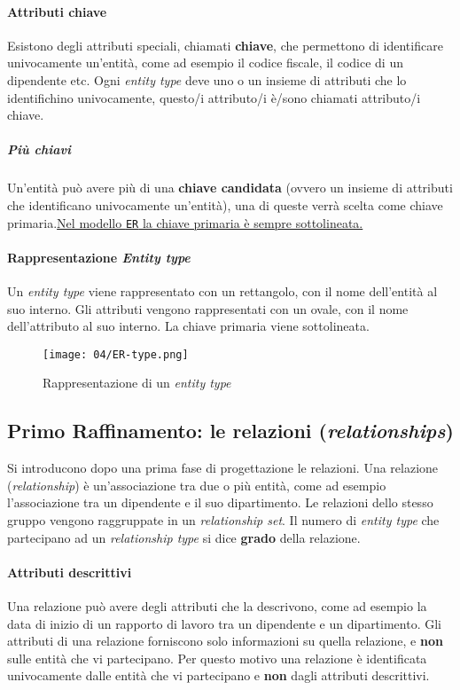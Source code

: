             \paragraph{Attributi chiave} Esistono degli attributi speciali, chiamati \textbf{chiave}, che permettono di identificare univocamente un'entità, come ad esempio il codice fiscale, il codice di un dipendente etc. Ogni \textit{entity type} deve uno o un insieme di attributi che lo identifichino univocamente, questo/i attributo/i è/sono chiamati attributo/i chiave.
            \subparagraph{Più chiavi} Un'entità può avere più di una \textbf{chiave candidata} (ovvero un insieme di attributi che identificano univocamente un'entità), una di queste verrà scelta come chiave primaria.\newline \underline{Nel modello \texttt{ER} la chiave primaria è sempre sottolineata.}
        \paragraph{Rappresentazione \textit{Entity type}} Un \textit{entity type} viene rappresentato con un rettangolo, con il nome dell'entità al suo interno. Gli attributi vengono rappresentati con un ovale, con il nome dell'attributo al suo interno. La chiave primaria viene sottolineata.
            \begin{figure}[H]
                \centering
                \texttt{[image: 04/ER-type.png]}
                \caption{Rappresentazione di un \textit{entity type}}
            \end{figure}
    \subsection{Primo Raffinamento: le relazioni (\textit{relationships})}
        Si introducono dopo una prima fase di progettazione le relazioni. Una relazione (\textit{relationship}) è un'associazione tra due o più entità, come ad esempio l'associazione tra un dipendente e il suo dipartimento. Le relazioni dello stesso gruppo vengono raggruppate in un \textit{relationship set}. Il numero di \textit{entity type} che partecipano ad un \textit{relationship type} si dice \textbf{grado} della relazione.
        \paragraph{Attributi descrittivi}
            Una relazione può avere degli attributi che la descrivono, come ad esempio la data di inizio di un rapporto di lavoro tra un dipendente e un dipartimento. Gli attributi di una relazione forniscono solo informazioni su quella relazione, e \textbf{non} sulle entità che vi partecipano. Per questo motivo una relazione è identificata univocamente dalle entità che vi partecipano e \textbf{non} dagli attributi descrittivi.
